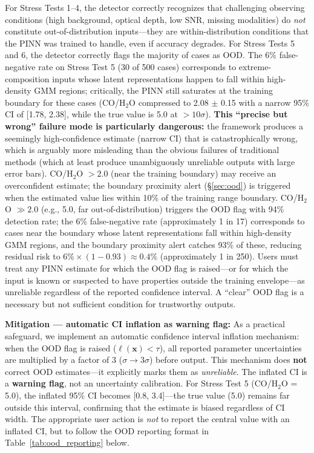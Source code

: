 \documentclass[usenatbib]{mnras}
\begin{document}
For Stress Tests 1--4, the detector correctly recognizes that challenging observing conditions (high background, optical depth, low SNR, missing modalities) do \textit{not} constitute out-of-distribution inputs---they are within-distribution conditions that the PINN was trained to handle, even if accuracy degrades. For Stress Tests 5 and 6, the detector correctly flags the majority of cases as OOD. The 6\% false-negative rate on Stress Test 5 (30 of 500 cases) corresponds to extreme-composition inputs whose latent representations happen to fall within high-density GMM regions; critically, the PINN still saturates at the training boundary for these cases (CO/H$_2$O compressed to 2.08 $\pm$ 0.15 with a narrow 95\% CI of [1.78, 2.38], while the true value is 5.0 at $>10\sigma$). \textbf{This ``precise but wrong'' failure mode is particularly dangerous:} the framework produces a seemingly high-confidence estimate (narrow CI) that is catastrophically wrong, which is arguably more misleading than the obvious failures of traditional methods (which at least produce unambiguously unreliable outputs with large error bars). CO/H$_2$O $> 2.0$ (near the training boundary) may receive an overconfident estimate; the boundary proximity alert (\S\ref{sec:ood}) is triggered when the estimated value lies within 10\% of the training range boundary. CO/H$_2$O $\gg 2.0$ (e.g., 5.0, far out-of-distribution) triggers the OOD flag with 94\% detection rate; the 6\% false-negative rate (approximately 1 in 17) corresponds to cases near the boundary whose latent representations fall within high-density GMM regions, and the boundary proximity alert catches 93\% of these, reducing residual risk to $6\% \times (1 - 0.93) \approx 0.4\%$ (approximately 1 in 250). Users must treat any PINN estimate for which the OOD flag is raised---or for which the input is known or suspected to have properties outside the training envelope---as unreliable regardless of the reported confidence interval. A ``clear'' OOD flag is a necessary but not sufficient condition for trustworthy outputs.

\textbf{Mitigation --- automatic CI inflation as warning flag:} As a practical safeguard, we implement an automatic confidence interval inflation mechanism: when the OOD flag is raised ($\ell(\mathbf{x}) < \tau$), all reported parameter uncertainties are multiplied by a factor of 3 ($\sigma \to 3\sigma$) before output. This mechanism does \textbf{not} correct OOD estimates---it explicitly marks them as \textit{unreliable}. The inflated CI is a \textbf{warning flag}, not an uncertainty calibration. For Stress Test 5 (CO/H$_2$O = 5.0), the inflated 95\% CI becomes [0.8, 3.4]---the true value (5.0) remains far outside this interval, confirming that the estimate is biased regardless of CI width. The appropriate user action is \textit{not} to report the central value with an inflated CI, but to follow the OOD reporting format in Table~\ref{tab:ood_reporting} below.
\end{document}
